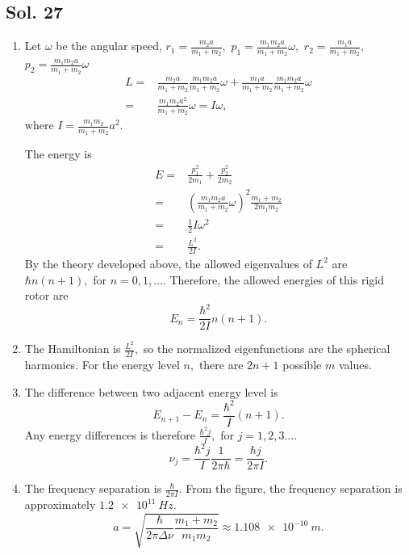    \subsection*{Sol. 27}
   \begin{enumerate}
       \item 
       Let $\omega$ be the angular speed, 
       $r_1=\frac{m_2a}{m_1+m_2},$ 
       $p_1 = \frac{m_1m_2a}{m_1+m_2}\omega,$
       $r_2=\frac{m_1a}{m_1+m_2},$ 
       $p_2 = \frac{m_1m_2a}{m_1+m_2}\omega$
       \begin{align*}
           L = &
       \frac{m_2a}{m_1+m_2}
       \frac{m_1m_2a}{m_1+m_2}\omega+
       \frac{m_1a}{m_1+m_2}\frac{m_1m_2a}{m_1+m_2}\omega\\
       =&\frac{m_1m_2a^2}{m_1+m_2}\omega = I\omega,
       \end{align*}
       where $I=\frac{m_1m_2}{m_1+m_2}a^2.$

       The energy is 
       \begin{align*}
           E =& \frac{p_1^2}{2m_1}
           +\frac{p_2^2}{2m_2}\\
           =&
           \left(\frac{m_1m_2a}{m_1+m_2}\omega\right)^2
           \frac{m_1+m_2}{2m_1m_2}\\
           =&\frac{1}{2}I\omega^2      \\
           =&\frac{L^2}{2I}.
       \end{align*}
       By the theory developed above, the allowed eigenvalues of $L^2$ are $\hbar n(n+1),$ for $n=0,1,\dots.$ Therefore, the allowed energies of this rigid rotor are $$
       E_n = \frac{\hbar^2}{2I}n(n+1).
       $$
       \item The Hamiltonian is $\frac{L^2}{2I},$ so the normalized eigenfunctions are the spherical harmonics. For the energy level $n,$ there are $2n+1$ possible $m$ values.
       \item 
       The difference between two adjacent energy level is 
       $$
       E_{n+1}
       -E_n
       =\frac{\hbar^2}{I}
       (n+1).
       $$
       Any energy differences is therefore 
       $\frac{\hbar^2j}{I},$ for $j=1,2,3\dots.$
       $$
       \nu_j=\frac{\hbar^2j}{I}\frac{1}{2\pi\hbar}
       =\frac{\hbar j}{2\pi I}.
       $$
       \item 
       The frequency separation is $\frac{\hbar}{2\pi I}.$
       From the figure, the frequency separation is approximately 
       $\qty{1.2e11}{Hz}.$
       $$
       a = \sqrt{\frac{\hbar}{2\pi\Delta\nu}\frac{m_1+m_2}{m_1m_2}}\approx \qty{1.108e-10}{m}.
       $$
   \end{enumerate}
